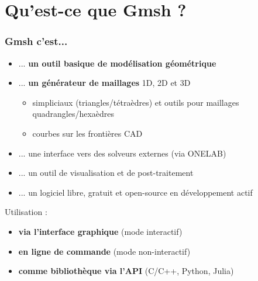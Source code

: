 \documentclass[aspectratio=169]{beamer}
\begin{document}
\section{Qu'est-ce que Gmsh ?}
\begin{frame}[fragile]
\frametitle{Gmsh c'est...}
\begin{itemize}
  \item ... \textbf{un outil basique de modélisation géométrique}
  \item ... \textbf{un générateur de maillages} 1D, 2D et 3D
  \begin{itemize}
    \item simpliciaux (triangles/tétraèdres) et outils pour maillages quadrangles/hexaèdres
    \item courbes sur les frontières CAD
  \end{itemize}
  \item ... une interface vers des solveurs externes (via ONELAB)
  \item ... un outil de visualisation et de post-traitement
  \item ... un logiciel libre, gratuit et open-source en développement actif
\end{itemize}
Utilisation :
\begin{itemize}
  \item \textbf{via l'interface graphique} (mode interactif)
  \item \textbf{en ligne de commande} (mode non-interactif)
  \item \textbf{comme bibliothèque via l'API} (C/C++, Python, Julia)
\end{itemize}

\end{frame}
\end{document}
